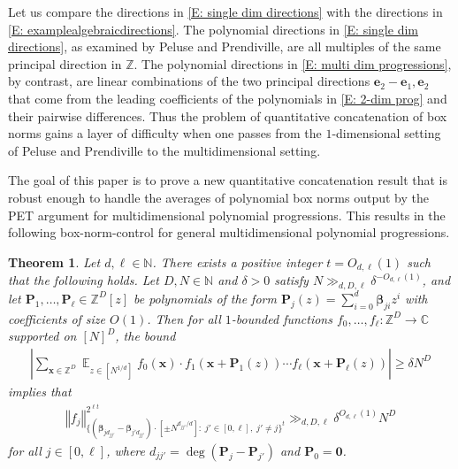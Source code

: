 \documentclass[11pt]{amsart}
\newtheorem{theorem}[lemma]{Theorem}
\theoremstyle{definition}
\DeclareMathOperator*{\E}{\mathbb{E}}
\newcommand{\C}{{\mathbb C}}
\newcommand{\N}{{\mathbb N}}
\newcommand{\Z}{{\mathbb Z}}
\newcommand{\be}{{\mathbf{e}}}
\newcommand{\bp}{{\textbf{P}}}
\newcommand{\p}{{\textbf{P}}}
\newcommand{\bx}{{\textbf{x}}}
\newcommand{\bbeta}{{\boldsymbol{\beta}}}
\newcommand{\norm}[1]{\left\Vert #1\right\Vert}
\newcommand{\abs}[1]{\mathopen{}\left| #1\mathclose{}\right|}
\begin{document}
Let us compare the directions in \eqref{E: single dim directions} with the directions in \eqref{E: examplealgebraicdirections}.  The polynomial directions in \eqref{E: single dim directions}, as examined by Peluse and Prendiville, are all multiples of the same principal direction in $\Z$.  The polynomial directions in \eqref{E: multi dim progressions}, by contrast, are linear combinations of the two principal directions $\be_2-\be_1, \be_2$ that come from the leading coefficients of the polynomials in \eqref{E: 2-dim prog} and their pairwise differences.  Thus the problem of quantitative concatenation of box norms gains a layer of difficulty when one passes from the $1$-dimensional setting of Peluse and Prendiville to the multidimensional setting.

The goal of this paper is to prove a new quantitative concatenation result that is robust enough to handle the averages of polynomial box norms output by the PET argument for multidimensional polynomial progressions.  This results in the following box-norm-control for general multidimensional polynomial progressions.


\begin{theorem}\label{T: single box norm bound simplified}
Let $d, \ell \in \N$.  There exists a positive integer $t=O_{d, \ell}(1)$ such that the following holds.  Let $D, N\in\N$ and $\delta>0$ satisfy $N\gg_{d,D,\ell}\delta^{-O_{d,\ell}(1)}$,  and let $\bp_1, \ldots, \bp_\ell\in\Z^D[z]$ be  polynomials of the form $\bp_j(z) = \sum_{i=0}^d \bbeta_{ji}z^i$ with coefficients of size $O(1)$.
     Then for all $1$-bounded functions $f_0, \ldots, f_\ell:\Z^D\to\C$ supported on $[N]^D$, the bound
    \begin{align}\label{E: concatenation of polynomials assumption -1}
            \abs{\sum_{\bx\in\Z^D}\E_{z\in[N^{1/d}]}
            f_0(\bx)\cdot f_1(\bx+\p_1(z))\cdots f_\ell(\bx+\p_\ell(z))} \geq \delta N^D
    \end{align}
    implies that
    \begin{align}\label{E: the box norm -1}
        \norm{f_j}_{\{(\bbeta_{jd_{jj'}}-\bbeta_{j'd_{jj'}})\cdot[\pm N^{d_{jj'}/d}]:\; j'\in[0,\ell],\; j'\neq j\}^{ t}}^{2^{\ell t}}\gg_{d, D, \ell}\delta^{O_{d, \ell}(1)}N^{D}
    \end{align}
    for all $j\in[0,\ell]$, where $d_{jj'} = \deg (\bp_j - \bp_{j'})$ and $\bp_0 = \mathbf{0}$. 
\end{theorem}
\end{document}
